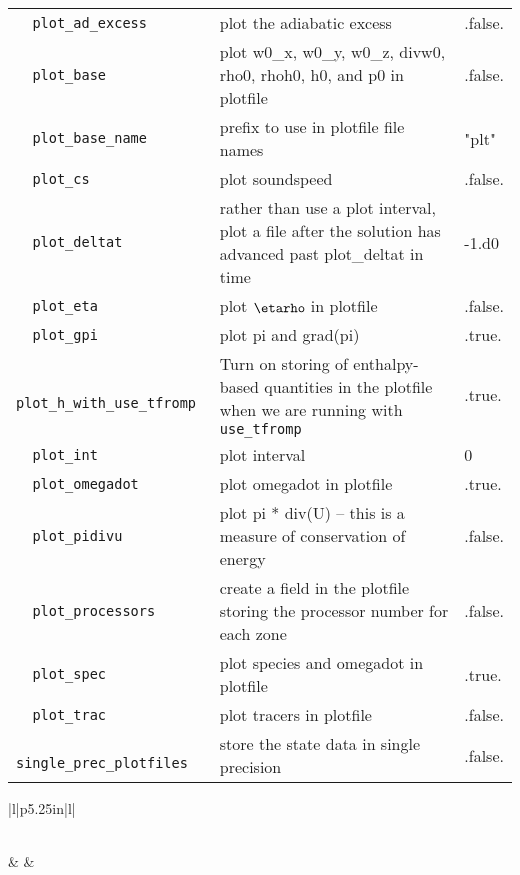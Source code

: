 \begin{landscape}
{\begin{center}
\begin{longtable}{|l|p{5.25in}|l|}
\verb=  plot_ad_excess  = &   plot the adiabatic excess  &  .false. \\
\rowcolor{tableShade}
\verb=  plot_base  = &   plot w0\_x, w0\_y, w0\_z, divw0, rho0, rhoh0, h0, and p0 in plotfile  &  .false. \\
\verb=  plot_base_name  = &   prefix to use in plotfile file names  &  "plt" \\
\rowcolor{tableShade}
\verb=  plot_cs  = &   plot soundspeed  &  .false. \\
\verb=  plot_deltat  = &   rather than use a plot interval, plot a file after the solution has advanced past plot\_deltat in time  &  -1.d0 \\
\rowcolor{tableShade}
\verb=  plot_eta  = &   plot $\etarho$ in plotfile  &  .false. \\
\verb=  plot_gpi  = &   plot pi and grad(pi)  &  .true. \\
\rowcolor{tableShade}
\verb=  plot_h_with_use_tfromp  = &   Turn on storing of enthalpy-based quantities in the plotfile when we are running with {\tt use\_tfromp}  &  .true. \\
\verb=  plot_int  = &   plot interval  &  0 \\
\rowcolor{tableShade}
\verb=  plot_omegadot  = &   plot omegadot in plotfile  &  .true. \\
\verb=  plot_pidivu  = &   plot pi * div(U) -- this is a measure of conservation of energy  &  .false. \\
\rowcolor{tableShade}
\verb=  plot_processors  = &   create a field in the plotfile storing the processor number for each zone  &  .false. \\
\verb=  plot_spec  = &   plot species and omegadot in plotfile  &  .true. \\
\rowcolor{tableShade}
\verb=  plot_trac  = &   plot tracers in plotfile  &  .false. \\
\verb=  single_prec_plotfiles  = &   store the state data in single precision  &  .false. \\


\end{longtable}
\end{center}

} %


{\small

\renewcommand{\arraystretch}{1.5}
%
\begin{center}
\begin{longtable}{|l|p{5.25in}|l|}
\caption[ particles
 parameters.]{ particles
 parameters.} \label{table:  particles
 parameters. runtime} \\
%
\hline {} & 
        & 
        \\ \hline 
\endfirsthead


\end{longtable}
\end{center}}
\end{landscape}
